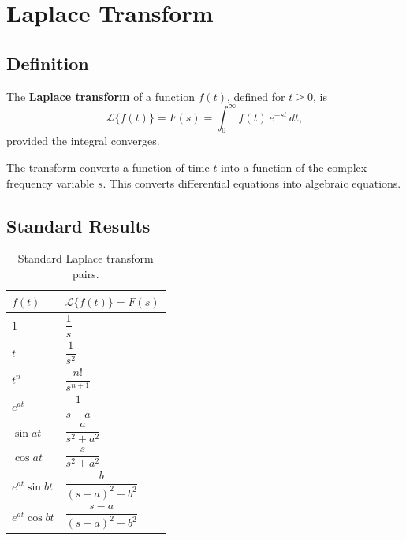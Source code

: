 \chapter{Laplace Transform}

\section{Definition}

\begin{definition}
The \textbf{Laplace transform} of a function $f(t)$, defined for $t \geq 0$, is
\[
  \mathcal{L}\{f(t)\} = F(s) = \int_0^{\infty} f(t)\,e^{-st}\,dt,
\]
provided the integral converges.
\end{definition}

\begin{remark}
The transform converts a function of time $t$ into a function of the complex frequency
variable $s$. This converts differential equations into algebraic equations.
\end{remark}

\section{Standard Results}

\begin{table}[h!]
\centering
\renewcommand{\arraystretch}{1.6}
\begin{tabular}{ll}
\toprule
$f(t)$ & $\mathcal{L}\{f(t)\} = F(s)$ \\
\midrule
$1$              & $\dfrac{1}{s}$                         \\[4pt]
$t$              & $\dfrac{1}{s^2}$                       \\[4pt]
$t^n$            & $\dfrac{n!}{s^{n+1}}$                  \\[4pt]
$e^{at}$         & $\dfrac{1}{s-a}$                       \\[4pt]
$\sin at$        & $\dfrac{a}{s^2+a^2}$                   \\[4pt]
$\cos at$        & $\dfrac{s}{s^2+a^2}$                   \\[4pt]
$e^{at}\sin bt$  & $\dfrac{b}{(s-a)^2+b^2}$              \\[4pt]
$e^{at}\cos bt$  & $\dfrac{s-a}{(s-a)^2+b^2}$            \\
\bottomrule
\end{tabular}
\caption{Standard Laplace transform pairs.}
\end{table}

